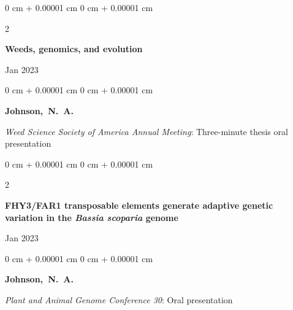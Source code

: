 \documentclass[10pt, letterpaper]{article}
\newenvironment{onecolentry}{
    \begin{adjustwidth}{
        0 cm + 0.00001 cm
    }{
        0 cm + 0.00001 cm
    }
}{
    \end{adjustwidth}
} %
\newenvironment{twocolentry}[2][]{
    \onecolentry
    \def\secondColumn{#2}
    \setcolumnwidth{\fill, 4.5 cm}
    \begin{paracol}{2}
}{
    \switchcolumn \raggedleft \secondColumn
    \end{paracol}
    \endonecolentry
} %
\begin{document}
        \begin{samepage}
            \begin{twocolentry}{
                Jan 2023
            }
                \textbf{Weeds, genomics, and evolution}
            \end{twocolentry}

            \vspace{0.10 cm}
            
            \begin{onecolentry}
                \mbox{\textbf{Johnson, N. A.}}

                \vspace{0.10 cm}
                
                \textit{Weed Science Society of America Annual Meeting}: Three-minute thesis oral presentation
            \end{onecolentry}
        \end{samepage} 


        \vspace{0.2 cm}
        

        \begin{samepage}
            \begin{twocolentry}{
                Jan 2023
            }
                \textbf{FHY3/FAR1 transposable elements generate adaptive genetic variation in the \textit{Bassia scoparia} genome}
            \end{twocolentry}

            \vspace{0.10 cm}
            
            \begin{onecolentry}
                \mbox{\textbf{Johnson, N. A.}}

                \vspace{0.10 cm}
                
                \textit{Plant and Animal Genome Conference 30}: Oral presentation
            \end{onecolentry}
        \end{samepage}      


        \vspace{0.2 cm}
        
\end{document}
